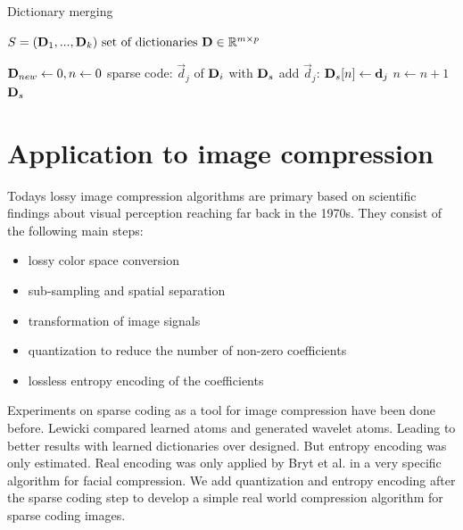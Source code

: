 \begin{algorithm}[H]
\caption{Dictionary merging}
\label{alg:merging}
\begin{algorithmic}[1]
\REQUIRE $ S = (\boldsymbol{\mathrm{D}}_1, ..., \boldsymbol{\mathrm{D}}_k) \text{ set of dictionaries } \boldsymbol{\mathrm{D}}
\in \mathbb{R}^{m\times p}$

\STATE $\boldsymbol{\mathrm{D}}_{new} \gets 0, n \gets 0$
\STATE sparse code: $\vec{d}_j$ of $\boldsymbol{\mathrm{D}}_i$ with $\boldsymbol{\mathrm{D}}_{s}$
\STATE add $\vec{d}_j$: $\boldsymbol{\mathrm{D}}_{s}[n] \gets \boldsymbol{\mathrm{d}}_{j}$
\STATE $n \gets n+1$
\ENDIF
\ENDFOR
\ENDFOR
\RETURN $\boldsymbol{\mathrm{D}}_s$
\end{algorithmic}
\end{algorithm}



\section{Application to image compression}
\label{sec:compression}
Todays lossy image compression algorithms are primary based on scientific
findings about visual perception reaching far back in the 1970s.
They consist of the following main steps:
\begin{itemize}
 \item lossy color space conversion
 \item sub-sampling and spatial separation
 \item transformation of image signals
 \item quantization to reduce the number of non-zero coefficients
 \item lossless entropy encoding of the coefficients 
\end{itemize}

Experiments on sparse coding as a tool for image compression have been done
before\cite{Lewicki1999,Murray2006}. Lewicki compared learned atoms and
generated wavelet atoms. Leading to better results with learned dictionaries
over designed. But entropy encoding was only estimated. 
Real encoding was only applied by Bryt et al.\cite{Bryt2008} in
a very specific algorithm for facial compression. We add quantization and
entropy encoding after the sparse coding step to develop a simple real world
compression algorithm for sparse coding images.


